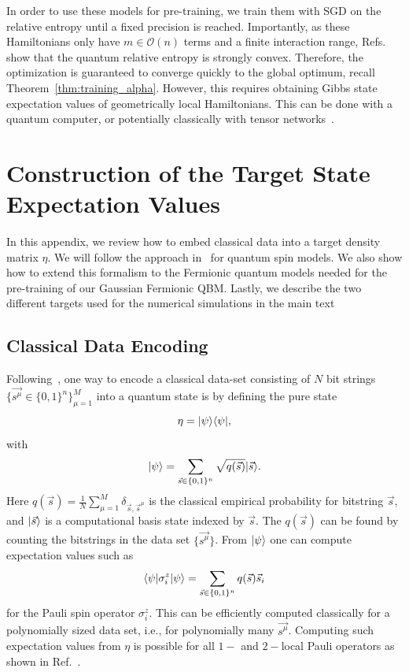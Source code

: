 \documentclass[
    aps,
    prx,
    floatfix,
    nofootinbib,
    onecolumn
]{revtex4-2}
\DeclarePairedDelimiter\bra{\langle}{\rvert}
\DeclarePairedDelimiter\ket{\lvert}{\rangle}
\begin{document}
In order to use these models for pre-training, we train them with SGD on the relative entropy until a fixed precision is reached. Importantly, as these Hamiltonians only have $m \in \mathcal{O}(n)$ terms and a finite interaction range, Refs.~\cite{Anshu_2021, Haah2022} show that the quantum relative entropy is strongly convex. Therefore, the optimization is guaranteed to converge quickly to the global optimum, recall Theorem~\ref{thm:training_alpha}. However, this requires obtaining Gibbs state expectation values of geometrically local Hamiltonians. This can be done with a quantum computer, or potentially classically with tensor networks~\cite{Kuwahara2021, Alhambra_2021}. 

\section{Construction of the Target State Expectation Values}
\label{app:dataencoding}
In this appendix, we review how to embed classical data into a target density matrix $\eta$. We will follow the approach in~\cite{Kappen_2020} for quantum spin models. We also show how to extend this formalism to the Fermionic quantum models needed for the pre-training of our Gaussian Fermionic QBM. Lastly, we describe the two different targets used for the numerical simulations in the main text

\subsection{Classical Data Encoding}
Following~\cite{Kappen_2020}, one way to encode a classical data-set consisting of $N$ bit strings $\{\vec{s^\mu}\in\{0,1\}^n\}_{\mu=1}^M$ into a quantum state is by defining the pure state \begin{equation}
    \eta = \ket{\psi}\bra{\psi},
\end{equation} with
\begin{equation}
    \ket{\psi} = \sum_{\vec{s}\in\{0,1\}^n} \sqrt{q(\vec{s})}\ket{\vec{s}}. 
\end{equation} Here $q(\vec{s})=\frac{1}{N}\sum_{\mu=1}^M\delta_{\vec{s}, \vec{s}^\mu}$ is the classical empirical probability for bitstring $\vec{s}$, and $\ket{\vec{s}}$ is a computational basis state indexed by $\vec{s}$. The $q(\vec{s})$ can be found by counting the bitstrings in the data set $\{\vec{s^\mu}\}$. From $\ket{\psi}$ one can compute expectation values such as \begin{equation} 
\bra{\psi}\sigma^z_i\ket{\psi} = \sum_{\vec{s}\in\{0,1\}^n}q(\vec{s})\vec{s}_i
\end{equation} for the Pauli spin operator $\sigma^z_i$. This can be efficiently computed classically for a polynomially sized data set, i.e., for polynomially many $\vec{s^\mu}$. Computing such expectation values from $\eta$ is possible for all $1-$ and $2-$local Pauli operators as shown in Ref.~\cite{Kappen_2020}. 
\end{document}
